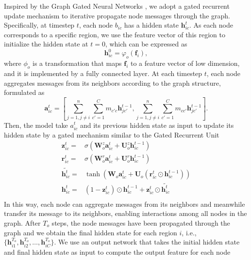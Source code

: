 \documentclass[10pt,twocolumn,letterpaper]{article}
\begin{document}
Inspired by the Graph Gated Neural Networks \cite{li2016gated,chen2018knowledge,wang2018deep}, we adopt a gated recurrent update mechanism to iterative propagate node messages through the graph. Specifically, at timestep $t$, each node $b_{ic}$ has a hidden state $\mathbf{h}_{ic}^t$. As each node corresponds to a specific region, we use the feature vector of this region to initialize the hidden state at $t=0$, which can be expressed as
\begin{equation}
  \mathbf{h}_{ic}^0=\varphi_o(\mathbf{f}_i),
  \label{eq:object-initialization}
\end{equation}
where $\phi_o$ is a transformation that maps $\mathbf{f}_i$ to a feature vector of low dimension, and it is implemented by a fully connected layer. At each timestep $t$, each node aggregates messages from its neighbors according to the graph structure, formulated as
\begin{equation}
  \mathbf{a}_{ic}^t=\left[\sum_{j=1,j\neq i}^{n}\sum_{c'=1}^{C}m_{c'c}\mathbf{h}_{jc'}^{t-1}, \sum_{j=1,j\neq i}^{n}\sum_{c'=1}^{C}m_{cc'}\mathbf{h}_{jc'}^{t-1}\right].
\end{equation}
Then, the model take $a_{ic}^t$ and its previous hidden state as input to update its hidden state by a gated mechanism similar to the Gated Recurrent Unit \cite{cho2014learning,li2016gated}
\begin{equation}
   \begin{split}
    \mathbf{z}_{ic}^t=&\sigma(\mathbf{W}_o^z{\mathbf{a}_{ic}^t}+\mathbf{U}_o^z{\mathbf{h}_{ic}^{t-1}}) \\
    \mathbf{r}_{ic}^t=&\sigma(\mathbf{W}_o^r{\mathbf{a}_{ic}^t}+\mathbf{U}_o^r{\mathbf{h}_{ic}^{t-1}}) \\
    \widetilde{\mathbf{h}_{ic}^t}=&\tanh\left(\mathbf{W}_o{\mathbf{a}_{ic}^t}+\mathbf{U}_o({\mathbf{r}_{ic}^t}\odot{\mathbf{h}_{ic}^{t-1}})\right)\\
    \mathbf{h}_{ic}^t=&(1-{\mathbf{z}_{ic}^t}) \odot{\mathbf{h}_{ic}^{t-1}}+{\mathbf{z}_{ic}^t}\odot{\widetilde{\mathbf{h}_{ic}^t}}\\
   \end{split}
   \label{eq:ggnn}
\end{equation}
In this way, each node can aggregate messages from its neighbors and meanwhile transfer its message to its neighbors, enabling interactions among all nodes in the graph. After $T_o$ steps, the node messages have been propagated through the graph and we obtain the final hidden state for each region $i$, i.e., $\{\mathbf{h}_{i1}^{T_o}, \mathbf{h}_{i2}^{T_o}, \dots, \mathbf{h}_{iC}^{T_o}\}$. We use an output network that takes the initial hidden state and final hidden state as input to compute the output feature for each node
\end{document}
